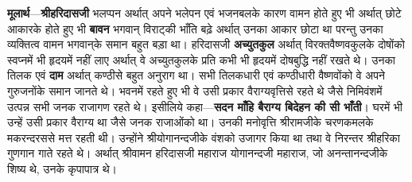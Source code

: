 \begin{sloppypar}\justifying{}
\textbf{मूलार्थ}—\textbf{श्रीहरिदासजी} भलप्पन अर्थात् अपने भलेपन एवं भजनबलके कारण वामन होते हुए भी अर्थात् छोटे आकारके होते हुए भी \textbf{बावन} भगवान् विराट्की भाँति बढ़े अर्थात् उनका आकार छोटा था परन्तु उनका व्यक्तित्व वामन भगवान्‌के समान बहुत बड़ा था। हरिदासजी \textbf{अच्युतकुल} अर्थात् विरक्त\-वैष्णव\-कुलके दोषोंको स्वप्नमें भी हृदयमें नहीं लाए अर्थात् वे अच्युतकुलके प्रति कभी भी हृदयमें दोषबुद्धि नहीं रखते थे। उनका तिलक एवं \textbf{दाम} अर्थात् कण्ठीसे बहुत अनुराग था। सभी तिलकधारी एवं कण्ठीधारी वैष्णवोंको वे अपने गुरुजनोंके समान जानते थे। भवनमें रहते हुए भी वे उसी प्रकार वैराग्य\-वृत्तिसे रहते थे जैसे निमिवंशमें उत्पन्न सभी जनक राजागण रहते थे। इसीलिये कहा—\textbf{सदन माँहि बैराग्य बिदेहन की सी भाँती}। घरमें भी उन्हें उसी प्रकार वैराग्य था जैसे जनक राजाओंको था। उनकी मनोवृत्ति श्रीरामजीके चरणकमलके मकरन्द\-रससे मत्त रहती थी। उन्होंने श्रीयोगानन्दजीके वंशको उजागर किया था तथा वे निरन्तर श्रीहरिका गुणगान गाते रहते थे। अर्थात् श्रीवामन हरिदासजी महाराज योगानन्दजी महाराज, जो अनन्तानन्दजीके शिष्य थे, उनके कृपापात्र थे।
\end{sloppypar}


